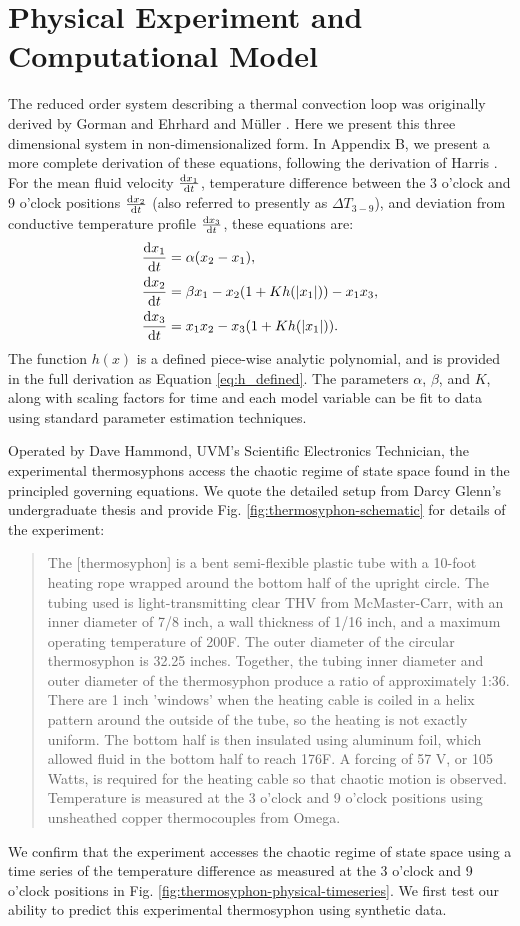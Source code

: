 \documentclass[10pt,letterpaper]{article}
\newcommand{\diff}[2]{\frac{{\rm d}#1}{{\rm d}#2}}
\begin{document}
\section*{Physical Experiment and Computational Model}

The reduced order system describing a thermal convection loop was originally derived by Gorman \cite{gorman1986} and Ehrhard and M\"{u}ller \cite{ehrhard1990dynamical}.
Here we present this three dimensional system in non-dimensionalized form.
In Appendix B, we present a more complete derivation of these equations, following the derivation of Harris \cite{harris2011predicting}.
For the mean fluid velocity $\diff{x_1}{t}$, temperature difference between the 3 o'clock and 9 o'clock positions $\diff{x_2}{t}$ (also referred to presently as $\Delta T_{3-9}$), and deviation from conductive temperature profile $\diff{x_3}{t}$, these equations are:
\begin{align}
& \diff{x_1}{t} = \alpha (x_2 - x_1),\\
& \diff{x_2}{t} = \beta x_1 - x_2 (1 + Kh(|x_1|)) - x_1x_3,\\
  & \diff{x_3}{t} = x_1x_2 - x_3 (1 + Kh(|x_1|)) .\end{align}
The function $h(x)$ is a defined piece-wise analytic polynomial, and is provided in the full derivation as Equation \ref{eq:h_defined}.
The parameters $\alpha$, $\beta$, and $K$, along with scaling factors for time and each model variable can be fit to data using standard parameter estimation techniques.

Operated by Dave Hammond, UVM's Scientific Electronics Technician, the experimental thermosyphons access the chaotic regime of state space found in the principled governing equations.
We quote the detailed setup from Darcy Glenn's undergraduate thesis \cite{glenn2013} and provide Fig. \ref{fig:thermosyphon-schematic} for details of the experiment:
\begin{quote}
The [thermosyphon] is a bent semi-flexible plastic tube with a 10-foot heating rope wrapped around the bottom half of the upright circle.
The tubing used is light-transmitting clear THV from McMaster-Carr, with an inner diameter of 7/8 inch, a wall thickness of 1/16 inch, and a maximum operating temperature of 200F.
The outer diameter of the circular thermosyphon is 32.25 inches.
Together, the tubing inner diameter and outer diameter of the thermosyphon produce a ratio of approximately 1:36.
There are 1 inch 'windows' when the heating cable is coiled in a helix pattern around the outside of the tube, so the heating is not exactly uniform.
The bottom half is then insulated using aluminum foil, which allowed fluid in the bottom half to reach 176F.
A forcing of 57 V, or 105 Watts, is required for the heating cable so that chaotic motion is observed.
Temperature is measured at the 3 o'clock and 9 o'clock positions using unsheathed copper thermocouples from Omega.
\end{quote}
We confirm that the experiment accesses the chaotic regime of state space using a time series of the temperature difference as measured at the 3 o'clock and 9 o'clock positions in Fig. \ref{fig:thermosyphon-physical-timeseries}.
We first test our ability to predict this experimental thermosyphon using synthetic data.
\end{document}
